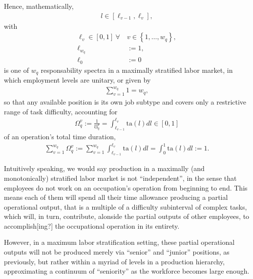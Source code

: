 \documentclass[hidelinks, nonatbib]{elsarticle}
\begin{document}
\begin{definition}
    \label{mmls_def}
    Hence, mathematically,
    \begin{gather}
    l \in \left[
    \ell_{v-1}
    ,
    \ell_{v}
    \right]
    ,
    \end{gather}
    with
    \begin{align}
    \ell_{v} \in [0,1]
    \
    \forall
    \
    &v \in 
    \left\{
        1, \dots, w_q
    \right\}
    ,
    \\
    \ell_{w_q} &:= 1
    ,
    \\
    \ell_0 &:= 0
    \end{align}
    is one of $w_q$ responsability spectra in a maximally stratified labor market, in which employment levels are unitary, or given by
    \begin{gather}
    \sum_{v=1}^{w_q}
    1
    =
    w_q
    ,
    \end{gather}
    so that any available position is its own job subtype and covers only a restrictive range of task difficulty, accounting for
    \begin{gather}
    \Omega_{q}^{v}
    := 
    \frac{1}{\mho_{q}^{v}}
    = 
    \int_{
        \ell_{v-1}
    }^{
        \ell_{v}
    }
    \text{ta}(l)dl
    \in [0,1]
    \end{gather}
    of an operation's total time duration,
    \begin{gather}
    \sum_{v=1}^{w_q}
    \Omega_{q}^{v} 
    := 
    \sum_{v=1}^{w_q}
    \int_{
        \ell_{v-1}
    }^{
        \ell_{v}
    }
    \text{ta}(l)dl
    =
    \int_{0}^{1}
    \text{ta}(l)dl
    :=
    1
    .
    \end{gather}
    
    Intuitively speaking, we would say production in a maximally (and monotonically) stratified labor market is not ``independent'', in the sense that employees do not work on an occupation's operation from beginning to end. This means each of them will spend all their time allowance producing a partial operational output, that is a multiple of a difficulty subinterval of complex tasks, which will, in turn, contribute, alonside the partial outputs of other employees, to accomplish[ing?] the occupational operation in its entirety.
    
    However, in a maximum labor stratification setting, these partial operational outputs will not be produced merely via ``senior'' and ``junior'' positions, as previously, but rather within a myriad of levels in a production hierarchy, approximating a continuum of ``seniority'' as the workforce becomes large enough.
    

\end{definition}
\end{document}
